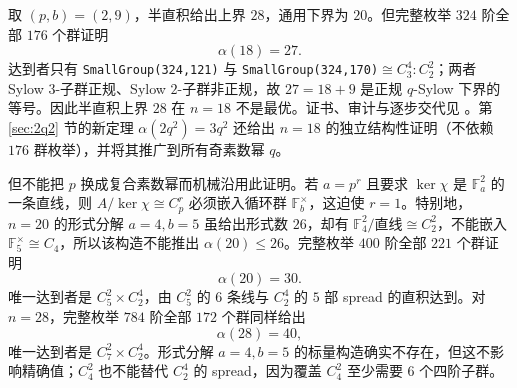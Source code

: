 \documentclass[11pt,a4paper]{article}
\numberwithin{equation}{section}
\theoremstyle{plain}
\theoremstyle{definition}
\theoremstyle{remark}
\newcommand{\F}{\mathbb{F}}
\begin{document}
取 $(p,b)=(2,9)$，半直积给出上界 $28$，通用下界为 $20$。但完整枚举 $324$ 阶全部 $176$ 个群证明
\begin{equation}\label{eq:n18-exact}
 \boxed{\alpha(18)=27.}
\end{equation}
达到者只有 \texttt{SmallGroup(324,121)} 与 \texttt{SmallGroup(324,170)}$\cong C_3^4{:}C_2^2$；两者 Sylow $3$-子群正规、Sylow $2$-子群非正规，故 $27=18+9$ 是正规 $q$-Sylow 下界的等号。因此半直积上界 $28$ 在 $n=18$ 不是最优。证书、审计与逐步交代见 。第 \ref{sec:2q2} 节的新定理 $\alpha(2q^2)=3q^2$ 还给出 $n=18$ 的独立结构性证明（不依赖 $176$ 群枚举），并将其推广到所有奇素数幂 $q$。

但不能把 $p$ 换成复合素数幂而机械沿用此证明。若 $a=p^r$ 且要求 $\ker\chi$ 是 $\F_a^2$ 的一条直线，则 $A/\ker\chi\cong C_p^r$ 必须嵌入循环群 $\F_b^\times$，这迫使 $r=1$。特别地，$n=20$ 的形式分解 $a=4,b=5$ 虽给出形式数 $26$，却有 $\F_4^2/\text{直线}\cong C_2^2$，不能嵌入 $\F_5^\times\cong C_4$，所以该构造不能推出 $\alpha(20)\le26$。完整枚举 $400$ 阶全部 $221$ 个群证明
\begin{equation}\label{eq:n20-exact}
 \boxed{\alpha(20)=30.}
\end{equation}
唯一达到者是 $C_5^2\times C_2^4$，由 $C_5^2$ 的 $6$ 条线与 $C_2^4$ 的 $5$ 部 spread 的直积达到。对 $n=28$，完整枚举 $784$ 阶全部 $172$ 个群同样给出
\begin{equation}\label{eq:n28-exact}
 \boxed{\alpha(28)=40,}
\end{equation}
唯一达到者是 $C_7^2\times C_2^4$。形式分解 $a=4,b=5$ 的标量构造确实不存在，但这不影响精确值；$C_4^2$ 也不能替代 $C_2^4$ 的 spread，因为覆盖 $C_4^2$ 至少需要 $6$ 个四阶子群。
\end{document}

